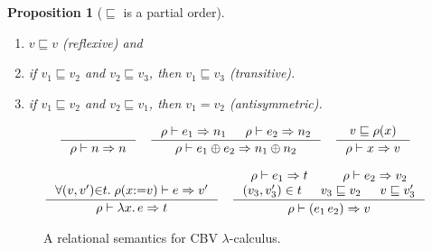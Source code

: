 \documentclass{tufte-handout}
\newcommand{\LAM}[1]{\lambda #1.\,}
\newcommand{\APP}[0]{\,}
\newcommand{\IF}[3]{\mathtt{if}\,#1\,\mathtt{then}\,#2\,\mathtt{else}\,#3}
\newtheorem{proposition}[theorem]{Proposition}
\begin{document}
\begin{proposition}[$\sqsubseteq$ is a partial order]\ 
\label{prop:val-le-refl}\label{prop:val-le-trans}
\begin{enumerate}
\item $v \sqsubseteq v$ (reflexive) and 
\item if $v_1 \sqsubseteq v_2$ and $v_2 \sqsubseteq v_3$,
  then $v_1 \sqsubseteq v_3$ (transitive). 
\item if $v_1 \sqsubseteq v_2$ and $v_2 \sqsubseteq v_1$,
  then $v_1 = v_2$ (antisymmetric).
\end{enumerate}
\end{proposition}

\begin{figure}[tbp]
\hfill{}
\begin{gather*}
  \inference{}{\rho \vdash n \Rightarrow n}
  \quad
  \inference
      {\rho \vdash e_1 \Rightarrow n_1 &
       \rho \vdash e_2 \Rightarrow n_2}
      {\rho \vdash e_1 \oplus e_2 \Rightarrow n_1 \oplus n_2}
  \quad
  \inference
      {v \sqsubseteq \rho(x)}
      {\rho \vdash x \Rightarrow v}
  \\[2ex]
  \inference
      {\forall (v,v'){\in} t.\; \rho(x{:=}v) \vdash e \Rightarrow v'}
      {\rho \vdash \LAM{x}e \Rightarrow t}
  \quad
  \inference
      {\rho \vdash e_1 \Rightarrow t &
       \rho \vdash e_2 \Rightarrow v_2 \\
      (v_3,v'_3) \in t & v_3 \sqsubseteq v_2 & v \sqsubseteq v'_3}
      {\rho \vdash (e_1\APP e_2) \Rightarrow v}
\end{gather*}
\caption{A relational semantics for CBV $\lambda$-calculus.}
\label{fig:denot-relation}
\end{figure}
\end{document}
